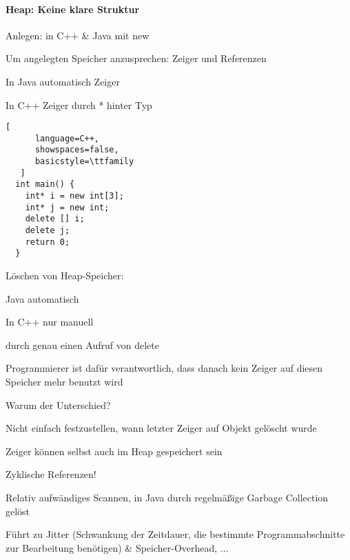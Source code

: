 \documentclass[10pt]{article}
\begin{document}
\paragraph{Heap: Keine klare Struktur}
\begin{itemize*}
  \item Anlegen: in C++ \& Java mit new
  \item Um angelegten Speicher anzusprechen: Zeiger und Referenzen
  \begin{itemize*}
    \item In Java automatisch Zeiger
    \item In C++ Zeiger durch * hinter Typ
    \begin{lstlisting}[
      language=C++,
      showspaces=false,
      basicstyle=\ttfamily
   ]
  int main() {
    int* i = new int[3];
    int* j = new int;
    delete [] i;
    delete j;
    return 0;
  }
  \end{lstlisting}
  \end{itemize*}
  
  \item Löschen von Heap-Speicher:
  \begin{itemize*}
    \item Java automatisch
    \item In C++ nur manuell
    \begin{itemize*}
      \item durch genau einen Aufruf von delete
      \item Programmierer ist dafür verantwortlich, dass danach kein Zeiger auf diesen Speicher mehr benutzt wird
    \end{itemize*}
  \end{itemize*}
  \item Warum der Unterschied?
  \begin{itemize*}
    \item Nicht einfach festzustellen, wann letzter Zeiger auf Objekt gelöscht wurde
    \begin{itemize*}
      \item Zeiger können selbst auch im Heap gespeichert sein
      \item Zyklische Referenzen!
    \end{itemize*}
    \item Relativ aufwändiges Scannen, in Java durch regelmäßige Garbage Collection gelöst
    \begin{itemize*}
      \item Führt zu Jitter (Schwankung der Zeitdauer, die bestimmte Programmabschnitte zur Bearbeitung benötigen) \& Speicher-Overhead, ...
    \end{itemize*}
  \end{itemize*}
\end{itemize*}
\end{document}
